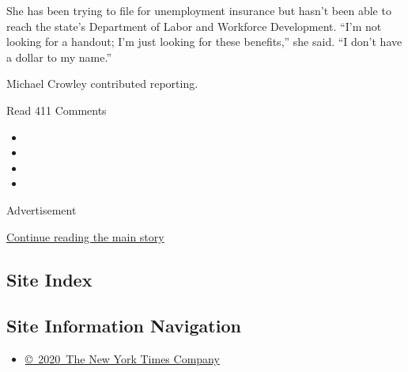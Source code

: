 She has been trying to file for unemployment insurance but hasn't been
able to reach the state's Department of Labor and Workforce Development.
``I'm not looking for a handout; I'm just looking for these benefits,''
she said. ``I don't have a dollar to my name.''

Michael Crowley contributed reporting.

Read 411 Comments

\begin{itemize}
\item
\item
\item
\item
\end{itemize}

Advertisement

\protect\hyperlink{after-bottom}{Continue reading the main story}

\hypertarget{site-index}{%
\subsection{Site Index}\label{site-index}}

\hypertarget{site-information-navigation}{%
\subsection{Site Information
Navigation}\label{site-information-navigation}}

\begin{itemize}
\tightlist
\item
  \href{https://help.nytimes3xbfgragh.onion/hc/en-us/articles/115014792127-Copyright-notice}{©~2020~The
  New York Times Company}
\end{itemize}

